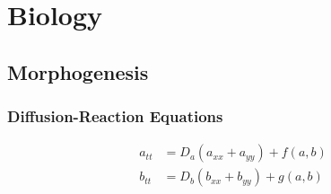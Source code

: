 \section{Biology}

\subsection{Morphogenesis}

\subsubsection{Diffusion-Reaction Equations}

\begin{eqnarray}
a_{tt} &= D_a (a_{xx} + a_{yy}) + f(a,b)  \\
b_{tt} &= D_b (b_{xx} + b_{yy}) + g(a,b) 
\end{eqnarray}


\begin{comment}

-Evolution
-Ecology (Predator-prey model)

\end{comment}